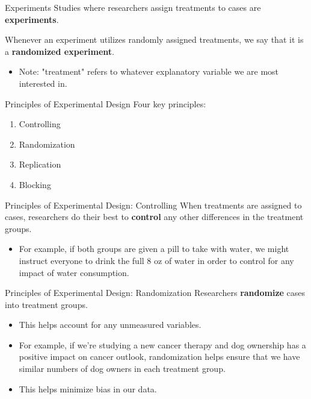 \begin{frame}{Experiments}
    Studies where researchers assign treatments to cases are \textbf{experiments}. 
    
    \vspace{12pt}
    Whenever an experiment utilizes randomly assigned treatments, we say that it is a \textbf{randomized experiment}. 
    
    \begin{itemize}
        \item Note: "treatment" refers to whatever explanatory variable we are most interested in. 
    \end{itemize}
\end{frame}

\begin{frame}{Principles of Experimental Design}
    Four key principles:
    \begin{enumerate}
        \item Controlling
        \item Randomization
        \item Replication
        \item Blocking
    \end{enumerate}
\end{frame}

\begin{frame}{Principles of Experimental Design: Controlling}
    When treatments are assigned to cases, researchers do their best to \textbf{control} any other differences in the treatment groups. 
    \begin{itemize}
        \item For example, if both groups are given a pill to take with water, we might instruct everyone to drink the full 8 oz of water in order to control for any impact of water consumption.
    \end{itemize}
\end{frame}

\begin{frame}{Principles of Experimental Design: Randomization}
    Researchers \textbf{randomize} cases into treatment groups.
    \begin{itemize}
        \item This helps account for any unmeasured variables.
        \item For example, if we're studying a new cancer therapy and dog ownership has a positive impact on cancer outlook, randomization helps ensure that we have similar numbers of dog owners in each treatment group. 
        \item This helps minimize bias in our data. 
    \end{itemize}
\end{frame}

